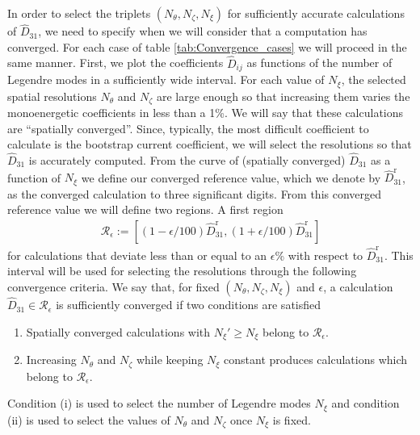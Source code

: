 In order to select the triplets $(N_\theta,N_\zeta, N_\xi)$ for sufficiently accurate calculations of $\widehat{D}_{31}$, we need to specify when we will consider that a computation has converged. For each case of table \ref{tab:Convergence_cases} we will proceed in the same manner. First, we plot the coefficients $\widehat{D}_{ij}$ as functions of the number of Legendre modes in a sufficiently wide interval. For each value of $N_\xi$, the selected spatial resolutions $N_\theta$ and $N_\zeta$ are large enough so that increasing them varies the monoenergetic coefficients in less than a 1\%. We will say that these calculations are ``spatially converged''. Since, typically, the most difficult coefficient to calculate is the bootstrap current coefficient, we will select the resolutions so that $\widehat{D}_{31}$ is accurately computed. From the curve of (spatially converged) $\widehat{D}_{31}$ as a function of $N_\xi$ we define our converged reference value, which we denote by $\widehat{D}_{31}^{\text{r}}$, as the converged calculation to three significant digits. From this converged reference value we will define two regions. A first region
%
\begin{align}
	\mathcal{R}_{\epsilon}:=
	\left[
	(1-\epsilon/100)\widehat{D}_{31}^{\text{r}}, (1+\epsilon/100)\widehat{D}_{31}^{\text{r}} 
	\right]
\end{align} 
for calculations that deviate less than or equal to an $\epsilon$\% with respect to $\widehat{D}_{31}^{\text{r}}$. This interval will be used for selecting the resolutions through the following convergence criteria. We say that, for fixed $(N_\theta,N_\zeta,N_\xi)$ and $\epsilon$, a calculation $\widehat{D}_{31}\in\mathcal{R}_{\epsilon}$ is sufficiently converged if two conditions are satisfied 
%
\begin{enumerate}
	\item Spatially converged calculations with $N_\xi'\ge N_\xi$ belong to $\mathcal{R}_{\epsilon}$.
	\item Increasing $N_\theta$ and $N_\zeta$ while keeping $N_\xi$ constant produces calculations which belong to $\mathcal{R}_{\epsilon}$.
\end{enumerate}
Condition (i) is used to select the number of Legendre modes $N_\xi$ and condition (ii) is used to select the values of $N_\theta$ and $N_\zeta$ once $N_\xi$ is fixed. 




